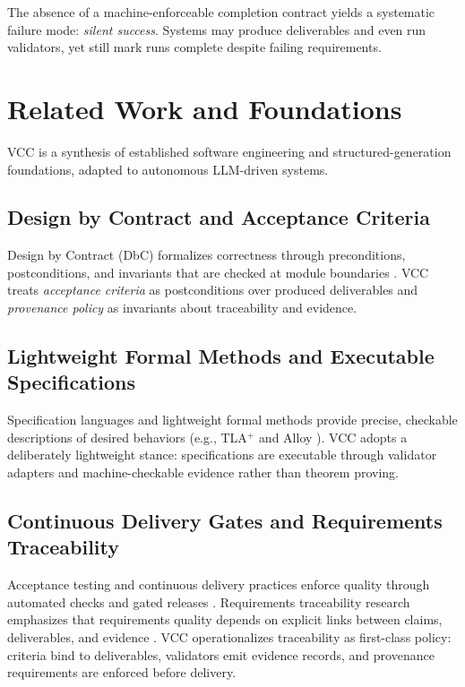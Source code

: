 \documentclass[11pt]{article}
\begin{document}
The absence of a machine-enforceable completion contract yields a systematic failure mode: \emph{silent success}. Systems may produce deliverables and even run validators, yet still mark runs complete despite failing requirements.

\section{Related Work and Foundations}

VCC is a synthesis of established software engineering and structured-generation foundations, adapted to autonomous LLM-driven systems.

\subsection{Design by Contract and Acceptance Criteria}
Design by Contract (DbC) formalizes correctness through preconditions, postconditions, and invariants that are checked at module boundaries \cite{meyer_dbc_ieee}.
VCC treats \emph{acceptance criteria} as postconditions over produced deliverables and \emph{provenance policy} as invariants about traceability and evidence.

\subsection{Lightweight Formal Methods and Executable Specifications}
Specification languages and lightweight formal methods provide precise, checkable descriptions of desired behaviors (e.g., TLA$^+$ \cite{lamport_specifying_systems_book,lamport_tla_sigops} and Alloy \cite{jackson_alloy_tosem}).
VCC adopts a deliberately lightweight stance: specifications are executable through validator adapters and machine-checkable evidence rather than theorem proving.

\subsection{Continuous Delivery Gates and Requirements Traceability}
Acceptance testing and continuous delivery practices enforce quality through automated checks and gated releases \cite{humble_farley_cd}.
Requirements traceability research emphasizes that requirements quality depends on explicit links between claims, deliverables, and evidence \cite{gotel_finkelstein_traceability,gotel_requirements_traceable_pdf}.
VCC operationalizes traceability as first-class policy: criteria bind to deliverables, validators emit evidence records, and provenance requirements are enforced before delivery.
\end{document}
